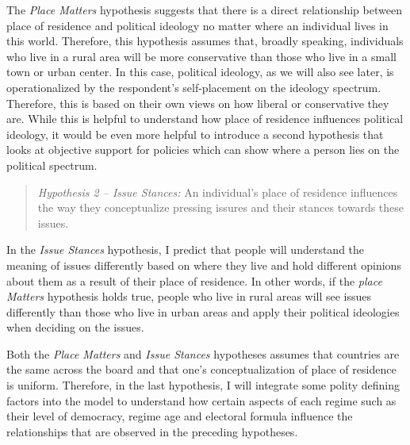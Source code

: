 \documentclass[12pt, titlepage]{article}
\newcommand\e{\emph}
\begin{document}
The \e{Place Matters} hypothesis suggests that there is a direct relationship between place of residence and political ideology no matter where an individual lives in this world. Therefore, this hypothesis assumes that, broadly speaking, individuals who live in a rural area will be more conservative than those who live in a small town or urban center. In this case, political ideology, as we will also see later, is operationalized by the respondent's self-placement on the ideology spectrum. Therefore, this is based on their own views on how liberal or conservative they are. While this is helpful to understand how place of residence influences political ideology, it would be even more helpful to introduce a second hypothesis that looks at objective support for policies which can show where a person lies on the political spectrum.

\begin{quote}
	\e{Hypothesis 2 -- Issue Stances:} An individual's place of residence influences the way they conceptualize pressing issures and their stances towards these issues.
\end{quote}

In the \e{Issue Stances} hypothesis, I predict that people will understand the meaning of issues differently based on where they live and hold different opinions about them as a result of their place of residence. In other words, if the \e{place Matters} hypothesis holds true, people who live in rural areas will see issues differently than those who live in urban areas and apply their political ideologies when deciding on the issues. 

Both the \e{Place Matters} and \e{Issue Stances} hypotheses assumes that countries are the same across the board and that one's conceptualization of place of residence is uniform. Therefore, in the last hypothesis, I will integrate some polity defining factors into the model to understand how certain aspects of each regime such as their level of democracy, regime age and electoral formula influence the relationships that are observed in the preceding hypotheses. 
\end{document}
